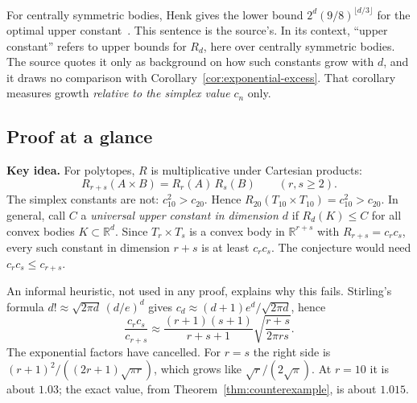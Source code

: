 \documentclass[11pt]{article}
\newcommand{\R}{\mathbb R}
\begin{document}
For centrally symmetric bodies, Henk gives the lower bound
\(2^d(9/8)^{\lfloor d/3\rfloor}\) for the optimal upper
constant~\cite{Henk}. This sentence is the source's. In its context,
``upper constant'' refers to upper bounds for \(R_d\), here over centrally
symmetric bodies. The source quotes it only as background on how such
constants grow with \(d\), and it draws no comparison with
Corollary~\ref{cor:exponential-excess}. That corollary measures growth
\emph{relative to the simplex value} \(c_n\) only.

\subsection{Proof at a glance}

\textbf{Key idea.} For polytopes, \(R\) is multiplicative under Cartesian
products:
\[
 R_{r+s}(A\times B)=R_r(A)\,R_s(B)\qquad(r,s\ge2).
\]
The simplex constants are not: \(c_{10}^2>c_{20}\). Hence
\(R_{20}(T_{10}\times T_{10})=c_{10}^2>c_{20}\). In general, call \(C\) a
\emph{universal upper constant in dimension \(d\)} if \(R_d(K)\le C\) for
all convex bodies \(K\subset\R^d\). Since \(T_r\times T_s\) is a convex
body in \(\R^{r+s}\) with \(R_{r+s}=c_rc_s\), every such constant in
dimension \(r+s\) is at least \(c_rc_s\). The conjecture would need
\(c_rc_s\le c_{r+s}\).

An informal heuristic, not used in any proof, explains why this fails.
Stirling's formula \(d!\approx\sqrt{2\pi d}\,(d/e)^d\) gives
\(c_d\approx(d+1)e^d/\sqrt{2\pi d}\), hence
\[
 \frac{c_rc_s}{c_{r+s}}\approx
 \frac{(r+1)(s+1)}{r+s+1}\sqrt{\frac{r+s}{2\pi rs}}.
\]
The exponential factors have cancelled. For \(r=s\) the right side is
\((r+1)^2/((2r+1)\sqrt{\pi r})\), which grows like \(\sqrt r/(2\sqrt\pi)\).
At \(r=10\) it is about \(1.03\); the exact value, from
Theorem~\ref{thm:counterexample}, is about \(1.015\).
\end{document}
